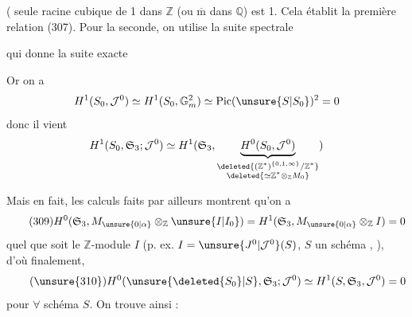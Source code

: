 ( seule racine  cubique de 1 dans $\mathbb Z$ (ou $\overline{\mathrm m}$ dans $\mathbb Q$) est 1. Cela établit la première relation (307). Pour la seconde, on utilise la suite spectrale




qui donne la suite exacte

Or on a
\[
H^1(S_0,\mathcal J^0)\simeq H^1(S_0,\mathbb G_m^2)\simeq\operatorname{Pic}(\unsure{S|S_0})^2=0
\]
donc il vient
\[
H^1(S_0,\mathfrak S_3;\mathcal J^0)\simeq H^1(\mathfrak S_3,\underbrace{H^0(S_0,\mathcal J^0)}_{\substack{\deleted{(\mathbb Z^*)^{\{0,1,\infty\}}/\mathbb Z^*}\\\deleted{\simeq\mathbb Z^*\otimes_{\mathbb Z}M_0}}})
\]

Mais en fait, les calculs faits par ailleurs montrent qu'on a
\[
\tag{309}
H^0(\mathfrak S_3,M_{\unsure{0|\alpha}}\otimes_{\mathbb Z}\unsure{I|I_0})=H^1(\mathfrak S_3,M_{\unsure{0|\alpha}}\otimes_{\mathbb Z}I)=0
\]
quel que soit le $\mathbb Z$-module $I$ (p. ex. $I=\unsure{J^0|\mathcal J^0}(S)$, $S$ un schéma , ), d'où finalement,
\[
\tag{\unsure{310}}
H^0(\unsure{\deleted{S_0}|S},\mathfrak S_3;\mathcal J^0)\simeq H^1(S,\mathfrak S_3,\mathcal J^0)=0
\]
pour $\forall$ schéma $S$. On trouve ainsi :

